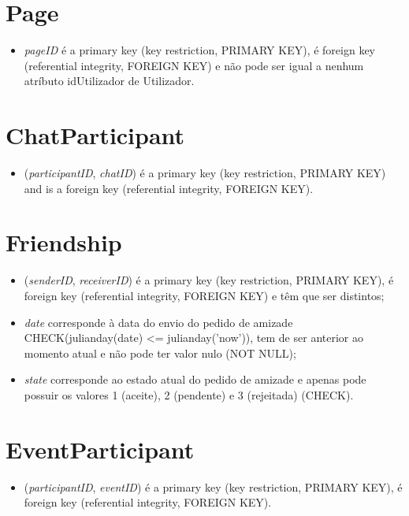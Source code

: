 \documentclass[12pt]{report}
\begin{document}
\section{Page}

\begin{itemize}
    \item \textit{pageID} é a primary key (key restriction, PRIMARY KEY), é foreign key (referential integrity, FOREIGN KEY) e não pode ser igual a nenhum atríbuto idUtilizador de Utilizador.
\end{itemize}

\section{ChatParticipant}

\begin{itemize}
    \item (\textit{participantID}, \textit{chatID}) é a primary key (key restriction, PRIMARY KEY) and is a foreign key (referential integrity, FOREIGN KEY).
\end{itemize}

\section{Friendship}

\begin{itemize}
    \item (\textit{senderID}, \textit{receiverID}) é a primary key (key restriction, PRIMARY KEY), é foreign key (referential integrity, FOREIGN KEY) e têm que ser distintos;
    \item \textit{date} corresponde à data do envio do pedido de amizade CHECK(julianday(date) <= julianday('now')), tem de ser anterior ao momento atual e não pode ter valor nulo (NOT NULL);
    \item \textit{state} corresponde ao estado atual do pedido de amizade e apenas pode possuir os valores 1 (aceite), 2 (pendente) e 3 (rejeitada) (CHECK).
\end{itemize}

\section{EventParticipant}

\begin{itemize}
    \item (\textit{participantID}, \textit{eventID}) é a primary key (key restriction, PRIMARY KEY), é foreign key (referential integrity, FOREIGN KEY).
\end{itemize}
\end{document}
